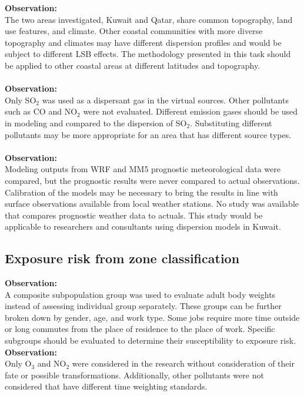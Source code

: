 \noindent
\textbf{Observation:}\\
The two areas investigated, Kuwait and Qatar, share common topography, land use features, and climate. Other coastal communities with more diverse topography and climates may have different dispersion profiles and would be subject to different LSB effects. The methodology presented in this task should be applied to other coastal areas at different latitudes and topography.\\
\noindent\\
\textbf{Observation:}\\
Only SO$_{2}$ was used as a dispersant gas in the virtual sources. Other pollutants such as CO and NO$_{2}$ were not evaluated. Different emission gases should be used in modeling and compared to the dispersion of SO$_{2}$. Substituting different pollutants may be more appropriate for an area that has different source types.\\
\noindent\\
\textbf{Observation:}\\
Modeling outputs from WRF and MM5 prognostic meteorological data were compared, but the prognostic results were never compared to actual observations. Calibration of the models may be necessary to bring the results in line with surface observations available from local weather stations. No study was available that compares prognostic weather data to actuals. This study would be applicable to researchers and consultants using dispersion models in Kuwait.

\subsection*{Exposure risk from zone classification}
\noindent
\textbf{Observation:}\\
A composite subpopulation group was used to evaluate adult body weights instead of assessing individual group separately. These groups can be further broken down by gender, age, and work type. Some jobs require more time outside or long commutes from the place of residence to the place of work. Specific subgroups should be evaluated to determine their susceptibility to exposure risk.\\

\noindent
\textbf{Observation:}\\
Only O$_{3}$ and NO$_{2}$ were considered in the research without consideration of their fate or possible transformations. Additionally, other pollutants were not considered that have different time weighting standards. 

